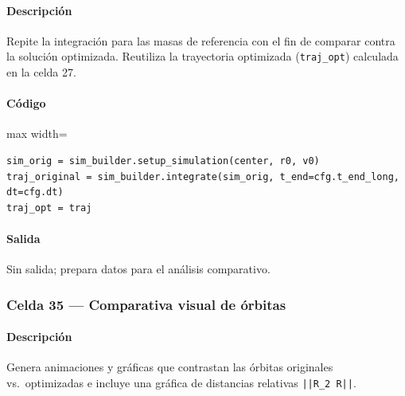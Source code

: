 \paragraph{Descripción} Repite la integración para las masas de referencia con el fin de comparar contra la solución optimizada. Reutiliza la trayectoria optimizada (\texttt{traj\_opt}) calculada en la celda 27.
\paragraph{Código}
\begin{listing}[H]
\caption{Celda 34: simulación con masas centrales}
\label{lst:c04_cell34}
\begin{adjustbox}{max width=\textwidth}
\begin{minipage}{\textwidth}
\begin{verbatim}
sim_orig = sim_builder.setup_simulation(center, r0, v0)
traj_original = sim_builder.integrate(sim_orig, t_end=cfg.t_end_long, dt=cfg.dt)
traj_opt = traj
\end{verbatim}
\end{minipage}
\end{adjustbox}
\end{listing}
\paragraph{Salida} Sin salida; prepara datos para el análisis comparativo.

\subsubsection*{Celda 35 — Comparativa visual de órbitas}
\paragraph{Descripción} Genera animaciones y gráficas que contrastan las órbitas originales vs.\ optimizadas e incluye una gráfica de distancias relativas \texttt{||R\_2 \- R||}.
